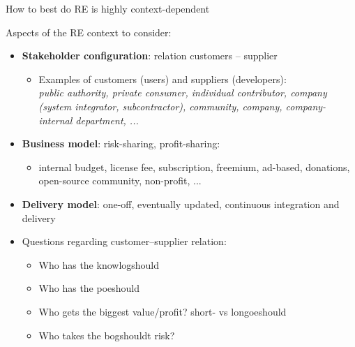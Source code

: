 \begin{Slide}{How to best do RE is highly context-dependent}

Aspects of the RE context to consider: 
\begin{itemize}
\item \textbf{Stakeholder configuration}: relation customers -- supplier  
\begin{itemize}
\item Examples of customers (users) and suppliers (developers): \\
    \textit{public authority, private consumer, individual contributor, company (system integrator, subcontractor), community, company, company-internal department, ...}
\end{itemize}
\item \textbf{Business model}: risk-sharing, profit-sharing: \\
\begin{itemize}
\item internal budget, license fee, subscription, freemium, ad-based, donations, open-source community, non-profit, ... 
\end{itemize}
\item \textbf{Delivery model}: one-off, eventually updated, continuous integration and delivery

\item Questions regarding customer--supplier relation:
\begin{itemize}
\item Who has the knowlogshould
\item Who has the poeshould
\item Who gets the biggest value/profit? short- vs longoeshould
\item Who takes the bogshouldt risk?


\end{itemize}
\end{itemize}
\end{Slide}